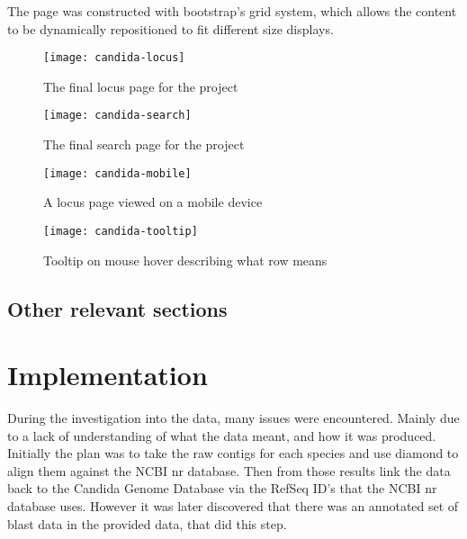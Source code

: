 The page was constructed with bootstrap's\cite{bootstrap} grid system, which allows the content to be dynamically repositioned to fit different size displays.

\begin{figure}[ht!]
\begin{center}
\texttt{[image: candida-locus]}
\caption{The final locus page for the project}
\end{center}
\end{figure}

\begin{figure}[ht!]
\begin{center}
\texttt{[image: candida-search]}
\caption{The final search page for the project}
\end{center}
\end{figure}

\begin{figure}[ht!]
\begin{center}
\texttt{[image: candida-mobile]}
\caption{A locus page viewed on a mobile device}
\end{center}
\end{figure}

\begin{figure}[ht!]
\begin{center}
\texttt{[image: candida-tooltip]}
\caption{Tooltip on mouse hover describing what row means}
\end{center}
\end{figure}


\subsection{Other relevant sections}

\section{Implementation}
During the investigation into the data, many issues were encountered. Mainly due to a lack of understanding of what the data meant, and how it was produced. Initially the plan was to take the raw contigs for each species and use diamond to align them against the NCBI nr database. Then from those results link the data back to the Candida Genome Database via the RefSeq ID's that the NCBI nr database uses. However it was later discovered that there was an annotated set of blast data in the provided data, that did this step. 

